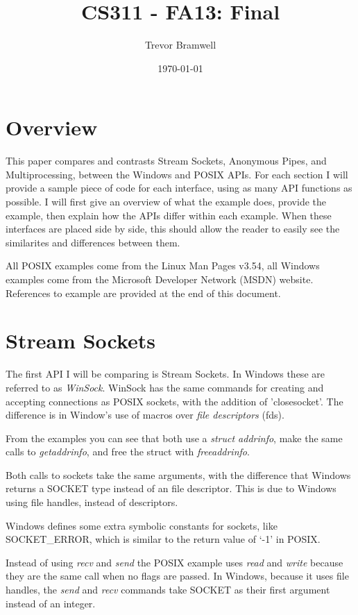 \documentclass[letterpaper,10pt]{article}
\title{CS311 - FA13: Final}
\date{\today}
\author{Trevor Bramwell}
\begin{document}
\maketitle

\section{Overview}

This paper compares and contrasts Stream Sockets, Anonymous Pipes, and
Multiprocessing, between the Windows and POSIX APIs. For each section I
will provide a sample piece of code for each interface, using as many
API functions as possible. I will first give an overview of what the
example does, provide the example, then explain how the APIs differ
within each example. When these interfaces are placed side by side, this
should allow the reader to easily see the similarites and differences
between them.

All POSIX examples come from the Linux Man Pages v3.54, all Windows
examples come from the Microsoft Developer Network (MSDN) website.
References to example are provided at the end of this document.

\section{Stream Sockets}

The first API I will be comparing is Stream Sockets. In Windows these are
referred to as \emph{WinSock}. WinSock has the same commands for
creating and accepting connections as POSIX sockets, with the addition
of 'closesocket'. The difference is in Window's use of macros over
\emph{file descriptors} (fds).




From the examples you can see that both use a \emph{struct addrinfo},
make the same calls to \emph{getaddrinfo}, and free the struct with
\emph{freeaddrinfo}.

Both calls to sockets take the same arguments, with the difference that
Windows returns a SOCKET type instead of an file descriptor. This is due
to Windows using file handles, instead of descriptors.

Windows defines some extra symbolic constants for sockets, like
SOCKET_ERROR, which is similar to the return value of `-1' in POSIX.

Instead of using \emph{recv} and \emph{send} the POSIX example uses
\emph{read} and \emph{write} because they are the same call when no
flags are passed. In Windows, because it uses file handles, the
\emph{send} and \emph{recv} commands take SOCKET as their first argument
instead of an integer.
\end{document}

